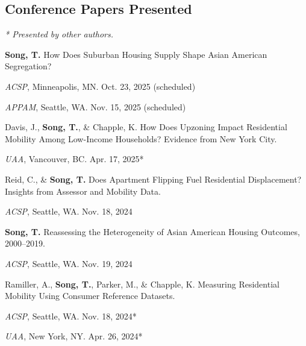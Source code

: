 \documentclass[11pt,letterpaper]{article}
\newcommand{\term}[1]{(#1)}
\begin{document}
\subsection{Conference Papers Presented}
{\footnotesize\emph{* Presented by other authors.}}\par\vspace{.35\baselineskip}
\begin{subpoints}
  \item \textbf{Song, T.} How Does Suburban Housing Supply Shape Asian American Segregation?
    \begin{subpoints2}
      \item \emph{ACSP}, Minneapolis, MN. Oct. 23, 2025 \term{scheduled}
      \item \emph{APPAM}, Seattle, WA. Nov. 15, 2025 \term{scheduled}
    \end{subpoints2}

  \item Davis, J., \textbf{Song, T.}, \& Chapple, K. How Does Upzoning Impact Residential Mobility Among Low-Income Households? Evidence from New York City.
    \begin{subpoints2}
      \item \emph{UAA}, Vancouver, BC. Apr. 17, 2025*
    \end{subpoints2}

  \item Reid, C., \& \textbf{Song, T.} Does Apartment Flipping Fuel Residential Displacement? Insights from Assessor and Mobility Data.
    \begin{subpoints2}
      \item \emph{ACSP}, Seattle, WA. Nov. 18, 2024
    \end{subpoints2}

  \item \textbf{Song, T.} Reassessing the Heterogeneity of Asian American Housing Outcomes, 2000–2019.
    \begin{subpoints2}
      \item \emph{ACSP}, Seattle, WA. Nov. 19, 2024
    \end{subpoints2}

  \item Ramiller, A., \textbf{Song, T.}, Parker, M., \& Chapple, K. Measuring Residential Mobility Using Consumer Reference Datasets.
    \begin{subpoints2}
      \item \emph{ACSP}, Seattle, WA. Nov. 18, 2024*
      \item \emph{UAA}, New York, NY. Apr. 26, 2024*
    \end{subpoints2}


\end{subpoints}
\end{document}
